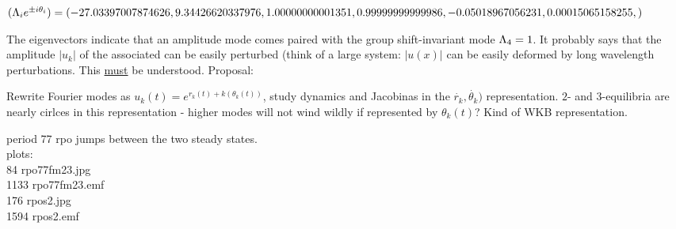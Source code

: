 $(\Lambda_i e^{\pm i\theta_i})=
(
 -27.03397007874626,
   9.34426620337976,
   1.00000000001351,
   0.99999999999986,
  -0.05018967056231,
   0.00015065158255,
)$

The eigenvectors
indicate that an amplitude mode comes paired with the 
group shift-invariant mode $\Lambda_4 =1$. It probably says that
the amplitude $|u_k|$ of the associated can be easily perturbed (think of
a large system: $|u(x)|$ can be easily deformed by long wavelength
perturbations. This \underline{must} be understood. Proposal:

Rewrite Fourier modes as $u_k(t) = e^{r_k(t) + k(\theta_k(t))}$, study
dynamics and Jacobinas in the $\dot{r_k},\dot{\theta_k})$ representation.
$2$- and $3$-equilibria are nearly cirlces in this representation - higher
modes will not wind wildly if represented by $\theta_k(t)$? Kind of WKB
representation.

period 77 rpo jumps between the two steady states.
\\
plots:	\\
  84 rpo77fm23.jpg	\\
1133 rpo77fm23.emf	\\
 176 rpos2.jpg	\\
1594 rpos2.emf	\\

